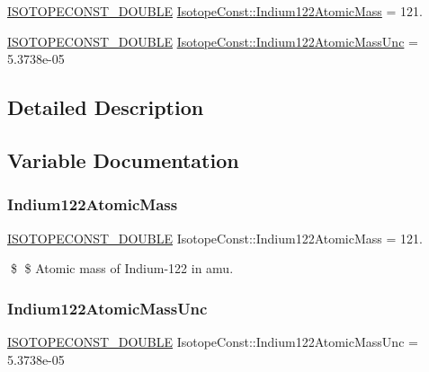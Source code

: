 \begin{DoxyCompactItemize}
\item 
\mbox{\hyperlink{group___isotope_const-_macros_ga8f45a7272ce02c0b4c65c44636ed719a}{I\+S\+O\+T\+O\+P\+E\+C\+O\+N\+S\+T\+\_\+\+D\+O\+U\+B\+LE}} \mbox{\hyperlink{group___isotope_const-_indium-_in122_ga5ccfd2518cdfaab6b88dee51d158e227}{Isotope\+Const\+::\+Indium122\+Atomic\+Mass}} = 121.
\item 
\mbox{\hyperlink{group___isotope_const-_macros_ga8f45a7272ce02c0b4c65c44636ed719a}{I\+S\+O\+T\+O\+P\+E\+C\+O\+N\+S\+T\+\_\+\+D\+O\+U\+B\+LE}} \mbox{\hyperlink{group___isotope_const-_indium-_in122_gafc3359eb02d77541a694b087158929cd}{Isotope\+Const\+::\+Indium122\+Atomic\+Mass\+Unc}} = 5.\+3738e-\/05
\end{DoxyCompactItemize}


\subsection{Detailed Description}


\subsection{Variable Documentation}
\mbox{\label{group___isotope_const-_indium-_in122_ga5ccfd2518cdfaab6b88dee51d158e227}} 
\subsubsection{\texorpdfstring{Indium122\+Atomic\+Mass}{Indium122AtomicMass}}
{\footnotesize\ttfamily \mbox{\hyperlink{group___isotope_const-_macros_ga8f45a7272ce02c0b4c65c44636ed719a}{I\+S\+O\+T\+O\+P\+E\+C\+O\+N\+S\+T\+\_\+\+D\+O\+U\+B\+LE}} Isotope\+Const\+::\+Indium122\+Atomic\+Mass = 121.}

\$ \$ Atomic mass of Indium-\/122 in amu. \mbox{\label{group___isotope_const-_indium-_in122_gafc3359eb02d77541a694b087158929cd}} 
\subsubsection{\texorpdfstring{Indium122\+Atomic\+Mass\+Unc}{Indium122AtomicMassUnc}}
{\footnotesize\ttfamily \mbox{\hyperlink{group___isotope_const-_macros_ga8f45a7272ce02c0b4c65c44636ed719a}{I\+S\+O\+T\+O\+P\+E\+C\+O\+N\+S\+T\+\_\+\+D\+O\+U\+B\+LE}} Isotope\+Const\+::\+Indium122\+Atomic\+Mass\+Unc = 5.\+3738e-\/05}

